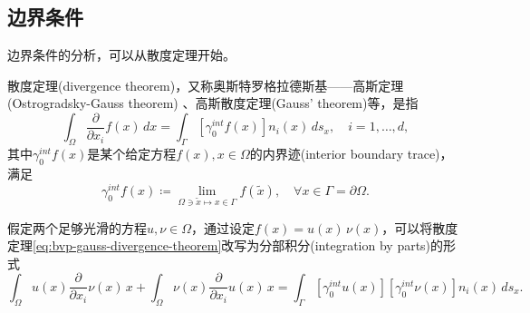 \subsection{边界条件}

边界条件的分析，可以从散度定理开始。
\begin{theorem}[散度定理]
  \label{theorem:bvp-gauss-divergence-theorem}
  散度定理(divergence theorem)，又称奥斯特罗格拉德斯基——高斯定理(Ostrogradsky-Gauss theorem) 、高斯散度定理(Gauss' theorem)等，是指
  \begin{equation}
    \label{eq:bvp-gauss-divergence-theorem}
    \int_{\Omega} \frac{\partial}{\partial x_i} f(x) \, dx = \int_{\Gamma} \left[ \gamma_0^{int} f(x) \right] n_i(x) \, d s_x, \quad i = 1,\ldots,d,
  \end{equation}
  其中$\gamma_0^{int} f(x)$是某个给定方程$f(x), x\in \Omega$的内界迹(interior boundary trace)，满足
  \begin{equation}
    \label{eq:bvp-interior-boundary-trace}
    \gamma_0^{int} f(x) \coloneqq \lim_{\Omega \owns \tilde{x} \mapsto x \in \Gamma} f \left( \tilde{x} \right), \quad \forall x \in \Gamma = \partial \Omega.
  \end{equation}
\end{theorem}

假定两个足够光滑的方程$u,\nu \in \Omega$，通过设定$f(x) = u(x) \, \nu(x)$，可以将散度定理\eqref{eq:bvp-gauss-divergence-theorem}改写为分部积分(integration by parts)的形式
\begin{equation*}
  \int_{\Omega} u(x) \frac{\partial}{\partial x_i} \nu(x) \, x
  + \int_{\Omega} \nu(x) \frac{\partial}{\partial x_i} u(x) \, x
  = \int_{\Gamma}  \left[ \gamma_0^{int} u(x) \right] \left[ \gamma_0^{int} \nu(x) \right] n_i(x) \, d s_x.
\end{equation*}


